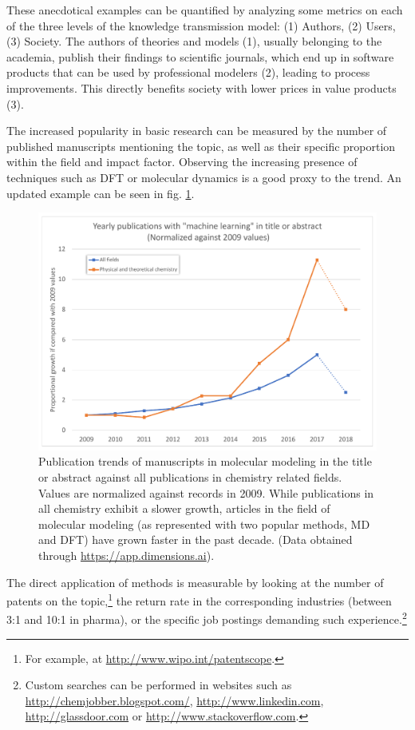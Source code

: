 These anecdotical examples can be quantified by analyzing some metrics on each of the three levels of the knowledge transmission model:\cite{warry2006} (1) Authors, (2) Users, (3) Society. The authors of theories and models (1), usually belonging to the academia, publish their findings to scientific journals, which end up in software products that can be used by professional modelers (2), leading to process improvements. This directly benefits society with lower prices in value products (3).

The increased popularity in basic research can be measured by the number of published manuscripts mentioning the topic, as well as their specific proportion within the field and impact factor. Observing the increasing presence of techniques such as DFT or molecular dynamics is a good proxy to the trend.\cite{maginn2009} An updated example can be seen in fig. \ref{fig:pubtrends}.


\begin{figure}[H]
	\includegraphics[width=\textwidth]{./figures/01/publication-trends_crop.pdf}
	\caption[Publication trends in molecular modeling]{Publication trends of manuscripts in molecular modeling in the title or abstract against all publications in chemistry related fields. Values are normalized against records in 2009. While publications in all chemistry exhibit a slower growth, articles in the field of molecular modeling (as represented with two popular methods, MD and DFT) have grown faster in the past decade. (Data obtained through \url{https://app.dimensions.ai}).}
	\label{fig:pubtrends}
\end{figure}


The direct application of methods is measurable by looking at the number of patents on the topic,\footnote{For example, at \url{http://www.wipo.int/patentscope}.} the return rate in the corresponding industries (between 3:1 and 10:1 in pharma\cite{accelryswhitepaper}), or the specific job postings demanding such experience.\footnote{Custom searches can be performed in websites such as \url{http://chemjobber.blogspot.com/}, \url{http://www.linkedin.com}, \url{http://glassdoor.com} or \url{http://www.stackoverflow.com}.}

